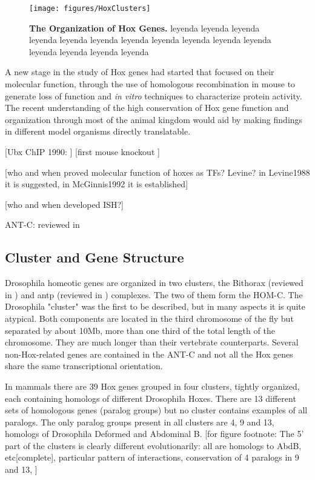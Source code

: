 \begin{figure}[]
  
  \centering
  \texttt{[image: figures/HoxClusters]}
  \caption[The Organization of Hox Genes]{\textbf{The Organization of Hox Genes.} leyenda leyenda leyenda leyenda leyenda leyenda leyenda leyenda leyenda leyenda leyenda leyenda leyenda leyenda leyenda}
  \label{fig:hoxclusters}
\end{figure}

A new stage in the study of Hox genes had started that focused on their molecular function, through the use of homologous recombination in mouse to generate loss of function and \textit{in vitro} techniques to characterize protein activity. The recent understanding of the high conservation of Hox gene function and organization through most of the animal kingdom would aid by making findings in different model organisms directly translatable. 

[Ubx ChIP 1990: \cite{Gould1990}]
[first mouse knockout \cite{Thomas1987}]

[who and when proved molecular function of hoxes as TFs? Levine? in Levine1988 it is suggested, in McGinnis1992 it is established]

[who and when developed ISH?]

\ac{ANT-C}: reviewed in \cite{Kaufman1990}

\subsection{Cluster and Gene Structure}


Drosophila homeotic genes are organized in two clusters, the  Bithorax (reviewed in \cite{Lewis1978}) and \ac{antp} (reviewed in \cite{Kaufman1990}) complexes. The two of them form the HOM-C. The Drosophila "cluster" was the first to be described, but in many aspects it is quite atypical. Both components are located in the third chromosome of the fly but separated by about 10Mb, more than one third of the total length of the chromosome. They are much longer than their vertebrate counterparts. Several non-Hox-related genes are contained in the \ac{ANT-C} and not all the Hox genes share the same transcriptional orientation. 

In mammals there are 39 Hox genes grouped in four clusters, tightly organized, each containing homologs of different Drosophila Hoxes. There are 13 different sets of homologous genes (paralog groups) but no cluster contains examples of all paralogs. The only paralog groups present in all clusters are 4, 9 and 13, homologs of Drosophila Deformed and Abdominal B. [for figure footnote: The 5' part of the clusters is clearly different evolutionarily: all are homologs to AbdB, etc[complete], particular pattern of interactions, conservation of 4 paralogs in 9 and 13, ] 

